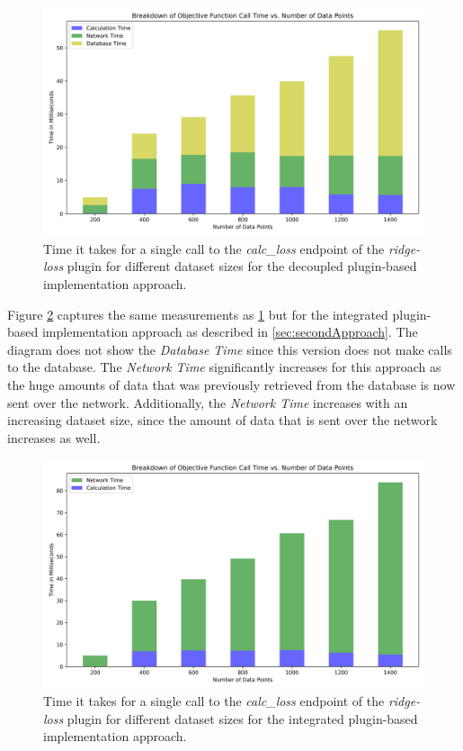 \documentclass[
  a4paper,  %
  twoside,  %
  bibliography=totoc,
  headsepline,
  cleardoublepage=empty,
  parskip=half,
  draft=false
]{scrbook}
\begin{document}
\begin{figure}
  \centering
  \includegraphics[width=\textwidth]{graphics/of_call_times_version1.png}
  \caption[Call time for \emph{calc\_loss} endpoint decoupled approach]{Time it takes for a single call to the \emph{calc\_loss} endpoint of the \emph{ridge-loss} plugin for different dataset sizes for the decoupled plugin-based implementation approach.}
  \label{fig:of_call_time_version1}
\end{figure}

Figure \ref{fig:of_call_time_version2} captures the same measurements as \ref{fig:of_call_time_version1} but for the integrated plugin-based implementation approach as described in \ref{sec:secondApproach}.
The diagram does not show the \emph{Database Time} since this version does not make calls to the database.
The \emph{Network Time} significantly increases for this approach as the huge amounts of data that was previously retrieved from the database is now sent over the network.
Additionally, the \emph{Network Time} increases with an increasing dataset size, since the amount of data that is sent over the network increases as well.

\begin{figure}
  \centering
  \includegraphics[width=\textwidth]{graphics/of_call_times_version2.png}
  \caption[Call time for \emph{calc\_loss} endpoint integrated approach]{Time it takes for a single call to the \emph{calc\_loss} endpoint of the \emph{ridge-loss} plugin for different dataset sizes for the integrated plugin-based implementation approach.}
  \label{fig:of_call_time_version2}
\end{figure}
\end{document}

